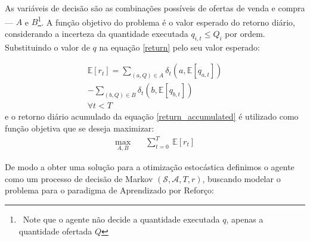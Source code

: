 As variáveis de decisão são as combinações possíveis de ofertas de venda e compra — $A$ e $B$\footnote{\ Note que o agente não decide a quantidade executada $q$, apenas a quantidade ofertada $Q$}. A função objetivo do problema é o valor esperado do retorno diário, considerando a incerteza da quantidade executada $q_{i, t} \leq Q_{i}$ por ordem. Substituindo o valor de $q$ na equação \ref{return} pelo seu valor esperado:

\begin{equation}
	\begin{aligned}
		\mathbb{E} [r_{t}] = \sum_{(a, Q) \in A} \delta_{t}(a, \mathbb{E}[q_{a, t}]) \\
		-\sum_{(b, Q) \in B} \delta_{t}(b, \mathbb{E}[q_{b, t}]) \\
		\forall t < T
	\end{aligned}
\end{equation}
e o retorno diário acumulado da equação \ref{return_accumulated} é utilizado como função objetiva que se deseja maximizar:
\begin{equation}
	\begin{aligned}
		\max_{A, B} \quad & \sum_{t=0}^{T} \ \mathbb{E} [r_{t}]
	\end{aligned}
\end{equation}

De modo a obter uma solução para a otimização estocástica definimos o agente como um processo de decisão de Markov $(\mathcal{S}, \mathcal{A}, T, r)$, buscando modelar o problema para o paradigma de Aprendizado por Reforço:


